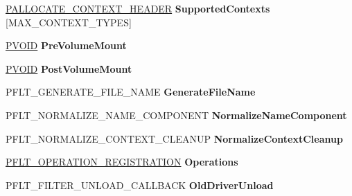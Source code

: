 \begin{DoxyCompactItemize}
\hyperlink{struct___a_l_l_o_c_a_t_e___c_o_n_t_e_x_t___h_e_a_d_e_r}{P\+A\+L\+L\+O\+C\+A\+T\+E\+\_\+\+C\+O\+N\+T\+E\+X\+T\+\_\+\+H\+E\+A\+D\+ER} {\bfseries Supported\+Contexts} \mbox{[}M\+A\+X\+\_\+\+C\+O\+N\+T\+E\+X\+T\+\_\+\+T\+Y\+P\+ES\mbox{]}
\item 
\mbox{\label{struct___f_l_t___f_i_l_t_e_r_ab9206fb748b9c3284fd0961b4f3a0a7b}} 
\hyperlink{interfacevoid}{P\+V\+O\+ID} {\bfseries Pre\+Volume\+Mount}
\item 
\mbox{\label{struct___f_l_t___f_i_l_t_e_r_aea7e70715f240059e0c67444c30661bd}} 
\hyperlink{interfacevoid}{P\+V\+O\+ID} {\bfseries Post\+Volume\+Mount}
\item 
\mbox{\label{struct___f_l_t___f_i_l_t_e_r_a2d182f2c6fd7fde91bf747c02b1e03b1}} 
P\+F\+L\+T\+\_\+\+G\+E\+N\+E\+R\+A\+T\+E\+\_\+\+F\+I\+L\+E\+\_\+\+N\+A\+ME {\bfseries Generate\+File\+Name}
\item 
\mbox{\label{struct___f_l_t___f_i_l_t_e_r_ae2a6fec256f8d2809fa11cba7d9d2659}} 
P\+F\+L\+T\+\_\+\+N\+O\+R\+M\+A\+L\+I\+Z\+E\+\_\+\+N\+A\+M\+E\+\_\+\+C\+O\+M\+P\+O\+N\+E\+NT {\bfseries Normalize\+Name\+Component}
\item 
\mbox{\label{struct___f_l_t___f_i_l_t_e_r_a8180a237af566acd7e26ee67b8f323f5}} 
P\+F\+L\+T\+\_\+\+N\+O\+R\+M\+A\+L\+I\+Z\+E\+\_\+\+C\+O\+N\+T\+E\+X\+T\+\_\+\+C\+L\+E\+A\+N\+UP {\bfseries Normalize\+Context\+Cleanup}
\item 
\mbox{\label{struct___f_l_t___f_i_l_t_e_r_ab5fd88813f2452f33eda1b7b54de900d}} 
\hyperlink{struct___f_l_t___o_p_e_r_a_t_i_o_n___r_e_g_i_s_t_r_a_t_i_o_n}{P\+F\+L\+T\+\_\+\+O\+P\+E\+R\+A\+T\+I\+O\+N\+\_\+\+R\+E\+G\+I\+S\+T\+R\+A\+T\+I\+ON} {\bfseries Operations}
\item 
\mbox{\label{struct___f_l_t___f_i_l_t_e_r_a416c22a58e6c5cf6d3dda052d8b7e386}} 
P\+F\+L\+T\+\_\+\+F\+I\+L\+T\+E\+R\+\_\+\+U\+N\+L\+O\+A\+D\+\_\+\+C\+A\+L\+L\+B\+A\+CK {\bfseries Old\+Driver\+Unload}
\item 
\mbox{\label{struct___f_l_t___f_i_l_t_e_r_ae6be70baf01485b8bf04cf29329e4982}} 

\end{DoxyCompactItemize}
